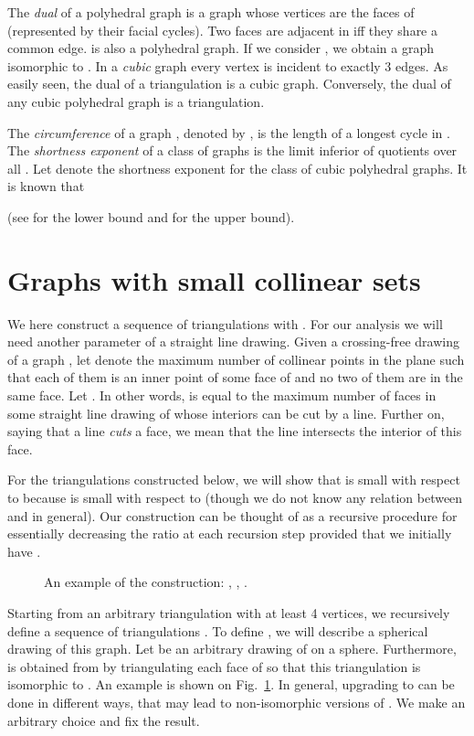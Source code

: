 \documentclass[reqno,12pt]{amsart}
\begin{document}
The \emph{dual} of a polyhedral graph  is a graph  whose
vertices are the faces of  (represented by their facial cycles).
Two faces are adjacent in  iff they share a common edge.
 is also a polyhedral graph. If we consider , we obtain
a graph isomorphic to . In a \emph{cubic} graph every vertex is
incident to exactly 3 edges. As easily seen, the dual of a triangulation
is a cubic graph. Conversely, the dual of any cubic polyhedral graph 
is a triangulation.

The \emph{circumference} of a graph , denoted by , is the
length of a longest cycle in . The \emph{shortness exponent}
of a class of graphs  is the limit inferior of quotients 
over all . Let  denote the shortness exponent
for the class of cubic polyhedral graphs. It is known that

(see \cite{BilinskiJMY11} for the lower bound and \cite[Theorem 7(iv)]{GWa} for the upper bound).




\section{Graphs with small collinear sets}\label{s:lin}

We here construct a sequence of triangulations  with .
For our analysis we will need another parameter of a straight line drawing.
Given a crossing-free drawing  of a graph ,
let  denote the maximum number of collinear points in the plane
such that each of them is an inner point of some face of 
and no two of them are in the same face. Let .
In other words,  is equal to the maximum number of faces in
some straight line drawing of  whose interiors can be cut by a line.
Further on, saying that a line \emph{cuts} a face, we mean that the line
intersects the interior of this face.

For the triangulations constructed below, we will show that 
is small with respect to  because  is small with respect
to  (though we do not know any relation between  and  in general). 
Our construction can be thought of as a recursive procedure
for essentially decreasing the ratio  at each recursion step
provided that we initially have .

\begin{figure}
\centerline{}
\caption{An example of the construction: , , .}
\label{fig:fromK4}
\end{figure}

Starting from an arbitrary triangulation  with at least 4 vertices, 
we recursively define 
a sequence of triangulations . To define , we will
describe a spherical drawing  of this graph. Let  be
an arbitrary drawing of  on a sphere. Furthermore, 
is obtained from  by triangulating each face of  so
that this triangulation is isomorphic to . An example is shown
on Fig.~\ref{fig:fromK4}. In general, upgrading  to 
can be done in different ways, that may lead to non-isomorphic versions
of . We make an arbitrary choice and fix the result.
\end{document}
